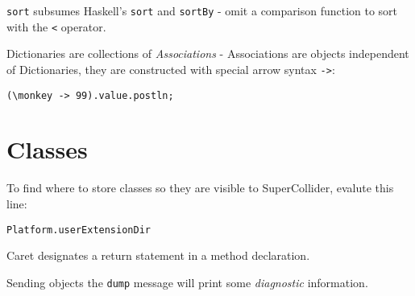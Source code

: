 \documentclass{article}
\begin{document}
\texttt{sort} subsumes Haskell's \texttt{sort} and 
\texttt{sortBy} - omit a comparison function to sort with the 
\texttt{<} operator.

Dictionaries are collections of \emph{Associations} - Associations 
are objects independent of Dictionaries, they are constructed with
special arrow syntax \texttt{->}:

\begin{verbatim}
(\monkey -> 99).value.postln;
\end{verbatim}


\section{Classes}

To find where to store classes so they are visible to 
SuperCollider, evalute this line:

\begin{verbatim}
Platform.userExtensionDir
\end{verbatim}

Caret designates a return statement in a method declaration.

Sending objects the \texttt{dump} message will print some 
\emph{diagnostic} information.

\end{document}
